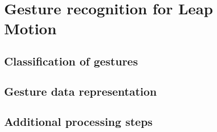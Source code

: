 \chapter{Gesture recognition for Leap Motion}

\section{Classification of gestures}

\section{Gesture data representation}

\section{Additional processing steps}
